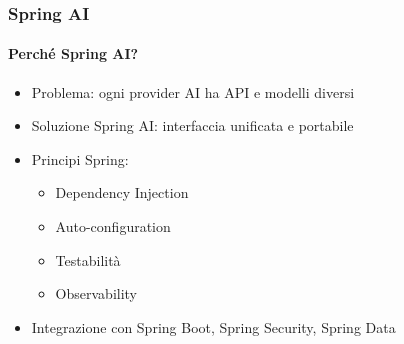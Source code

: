 %
\begin{frame}[t,fragile] \frametitle{Spring AI}
	{\scriptsize
		\onslide<1->
            \framesubtitle{Perché Spring AI?}
            \vspace*{-10pt}
	    	\begin{minipage}[t]{\textwidth}
				\begin{minipage}[t]{0.6\textwidth}
	    			\begin{itemize}[leftmargin=10pt,align=right]
						\onslide<2->\item[\alert{\faHandORight}] \alert{Problema:} ogni provider AI ha API e modelli diversi
						\onslide<3->\item[\alert{\faHandORight}] \alert{Soluzione Spring AI:} interfaccia unificata e portabile
						\onslide<4->\item[\alert{\faHandORight}] \alert{Principi Spring:}
						\begin{itemize}[leftmargin=10pt,align=right]
							\item[\alert{\faHandORight}] Dependency Injection
							\item[\alert{\faHandORight}] Auto-configuration
							\item[\alert{\faHandORight}] Testabilità
							\item[\alert{\faHandORight}] Observability
						\end{itemize}
						\item[\alert{\faHandORight}] \alert{Integrazione} con Spring Boot, Spring Security, Spring Data
					\end{itemize}
            	\end{minipage}
            	\begin{minipage}[t]{0.4\textwidth}
            	\end{minipage}
	    	\end{minipage}
	}
\end{frame}
%
